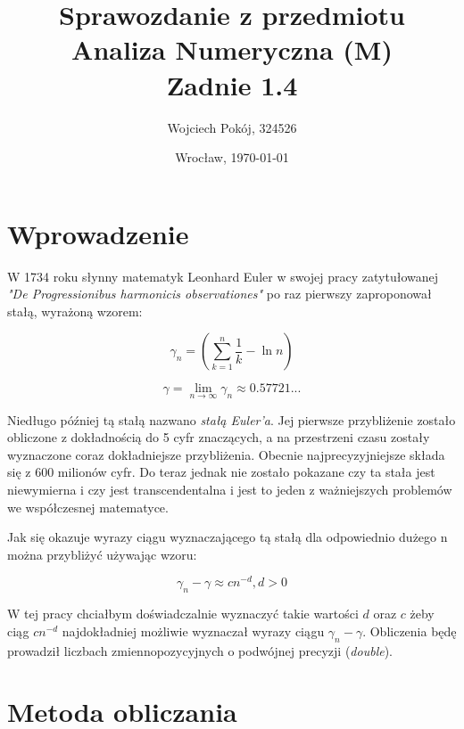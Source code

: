 \documentclass[11pt,wide]{mwart}
\date{Wrocław, \today}
\title{\LARGE\textbf{Sprawozdanie z przedmiotu Analiza Numeryczna (M)\\Zadnie 1.4}}
\author{Wojciech Pokój, 324526}
\begin{document}
\maketitle                
\thispagestyle{empty}     
\tableofcontents    

\section{Wprowadzenie}

W 1734 roku słynny matematyk Leonhard Euler w swojej pracy zatytułowanej \textit{"De Progressionibus harmonicis observationes"} po raz pierwszy zaproponował stałą, wyrażoną wzorem:

\begin{equation}
\gamma_{n} = (\sum_{k=1}^{n}\frac{1}{k} - \ln{n})
\end{equation}

\begin{equation}
\gamma = \lim_{n \to \infty} \gamma_{n} \approx 0.57721...
\end{equation}

Niedługo później tą stałą nazwano \textit{stałą Euler'a}.
Jej pierwsze przybliżenie zostało obliczone z dokładnością do 5 cyfr znaczących, a na przestrzeni czasu zostały wyznaczone coraz dokładniejsze przybliżenia. Obecnie najprecyzyjniejsze
składa się z 600 milionów cyfr. Do teraz jednak nie zostało pokazane czy ta stała jest niewymierna i czy jest transcendentalna i jest to jeden z ważniejszych problemów we współczesnej matematyce.

Jak się okazuje wyrazy ciągu wyznaczającego tą stałą dla odpowiednio dużego n można przybliżyć używając wzoru:

\begin{equation}
\gamma_{n} - \gamma \approx cn^{-d}, d > 0
\end{equation}

W tej pracy chciałbym doświadczalnie wyznaczyć takie wartości $ d $ oraz $ c $ żeby ciąg $cn^{-d}$ najdokładniej możliwie wyznaczał wyrazy ciągu $\gamma_{n} - \gamma$. Obliczenia będę prowadził liczbach 
zmiennopozycyjnych o podwójnej precyzji (\textit{double}).


\section{Metoda obliczania}
\end{document}
